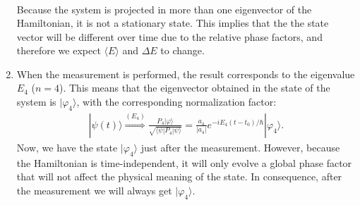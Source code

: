 \documentclass[letterpaper,11pt,twoside]{article}
\newcommand{\ket}[1]{|#1\rangle}
\newcommand{\braket}[1]{\langle#1\rangle}
\begin{document}
\begin{enumerate}[itemsep=0pt,topsep=0pt,label=\alph*.]
\begin{align*}
  \end{align*}
  Because the system is projected in more than one eigenvector of the Hamiltonian, it is not a stationary state. This implies that the the state vector 
  will be different over time due to the relative phase factors, and therefore we expect $\braket{E}$ and $\Delta E$ to change.
  \item When the measurement is performed, the result corresponds to the eigenvalue $E_4$ ($n=4$). This means that the eigenvector obtained in the state of the system
  is $\ket{\varphi_4}$, with the corresponding normalization factor:
  \begin{align*}
    \ket{\psi(t)}\stackrel{(E_4)}{\Longrightarrow}\frac{P_4\ket{\varphi}}{\sqrt{\braket{\psi|P_4|\psi}}}=\frac{a_4}{|a_4|}e^{-iE_4(t-t_0)/\hbar}\ket{\varphi_4}.
  \end{align*}
  Now, we have the state $\ket{\varphi_4}$ just after the measurement. However, because the Hamiltonian is time-independent, it will only evolve a global phase factor that will 
  not affect the physical meaning of the state. In consequence, after the measurement we will always get $\ket{\varphi_4}$.
\end{enumerate}
\end{document}
